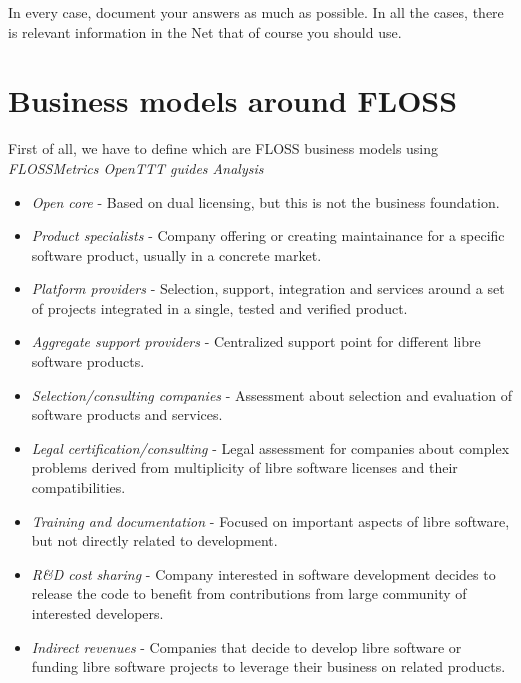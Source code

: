 \documentclass[11pt]{scrartcl}
\begin{document}
\par In every case, document your answers as much as possible. In all the cases, there is relevant information in the Net that of course you should use.

\section{Business models around FLOSS}

\par First of all, we have to define which are FLOSS business models using \emph{FLOSSMetrics OpenTTT guides Analysis}\cite{floss-bm}

\begin{itemize}
	\item \emph{Open core} - Based on dual licensing, but this is not the business foundation. 

	\item \emph{Product specialists} - Company offering or creating maintainance for a specific software product, usually in a concrete market.

	\item \emph{Platform providers} - Selection, support, integration and services around a set of projects integrated in a single, tested and verified product.

	\item \emph{Aggregate support providers} - Centralized support point for different libre software products.

	\item \emph{Selection/consulting companies} - Assessment about selection and evaluation of software products and services.

	\item \emph{Legal certification/consulting} - Legal assessment for companies about complex problems derived from multiplicity of libre software licenses and their compatibilities.

	\item \emph{Training and documentation} - Focused on important aspects of libre software, but not directly related to development.

	\item \emph{R\&D cost sharing} - Company interested in software development decides to release the code to benefit from contributions from large community of interested developers.

	\item \emph{Indirect revenues} - Companies that decide to develop libre software or funding libre software projects to leverage their business on related products.

\end{itemize}
\end{document}
